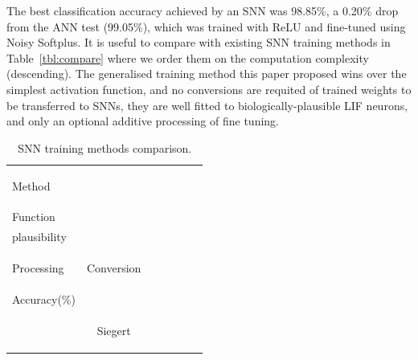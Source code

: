 \documentclass{article}
\newenvironment{mycell}[1]
{
	\begin{minipage}{#1}
		\begin{center}
			\vspace*{0.15cm}
		}
		{
			\vspace*{0.1cm}
		\end{center}
	\end{minipage}
}
\begin{document}
	The best classification accuracy achieved by an SNN was 98.85\%, a 0.20\% drop from the ANN test (99.05\%), which was trained with ReLU and fine-tuned using Noisy Softplus.
	It is useful to compare with existing SNN training methods in Table~\ref{tbl:compare} where we order them on the computation complexity (descending).
	The generalised training method this paper proposed wins over the simplest activation function, and no conversions are requited of trained weights to be transferred to SNNs, they are well fitted to biologically-plausible LIF neurons, and only an optional additive processing of fine tuning.
	
	
	
  \begin{table}[thb!]
	\caption{SNN training methods comparison.}
	\begin{center}
		\bgroup
		\def\arraystretch{1.1}
		\begin{tabular}{l c c c c c c}
			\begin{mycell}{1cm} Method \end{mycell} & 
			\begin{mycell}{1.8cm}Activation\\Function\end{mycell} &
			\begin{mycell}{1.8cm} Biologically-\\plausibility \end{mycell} &  
			\begin{mycell}{1.8cm} Additional\\Processing \end{mycell} &
			\begin{mycell}{1.8cm} Conversion \end{mycell} & 
			\begin{mycell}{1.8cm} Classification\\Accuracy(\%) \end{mycell} 
			\\
			\hline
			\begin{mycell}{1cm} \cite{Jug_etal_2012} \end{mycell} & 
			\begin{mycell}{1.8cm}Siegert \end{mycell} &

\end{tabular}
\end{center}
\end{table}
\end{document}
